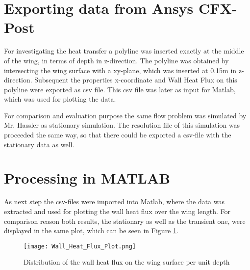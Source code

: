 \section{Exporting data from Ansys CFX-Post}
For investigating the heat transfer a polyline was inserted exactly at the middle of the wing, in terms of depth in z-direction. The polyline was obtained by intersecting the wing surface with a xy-plane, which was inserted at 0.15m in z-direction. 
Subsequent the properties x-coordinate and Wall Heat Flux on this polyline were exported as csv file. This csv file was later as input for Matlab, which was used for plotting the data.

For comparison and evaluation purpose the same flow problem was simulated by Mr. Hassler as stationary simulation. The resolution file of this simulation was proceeded the same way, so that there could be exported a csv-file with the stationary data as well.
\section{Processing in MATLAB\textsuperscript{\textregistered}}
As next step the csv-files were imported into Matlab, where the data was extracted and used for plotting the wall heat flux over the wing length. For comparison reason both results, the stationary as well as the transient one, were displayed in the same plot, which can be seen in Figure \ref{fig:whf_plot}.

\begin{figure}[h]
\centering
\texttt{[image: Wall\_Heat\_Flux\_Plot.png]}
\caption{Distribution of the wall heat flux on the wing surface per unit depth}
\label{fig:whf_plot}
\end{figure}


